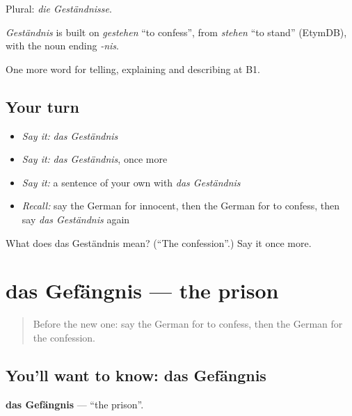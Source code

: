 Plural: \emph{die Geständnisse}.

\begin{cousinweb}
\emph{Geständnis} is built on \emph{gestehen} \textquotedblleft{}to confess\textquotedblright{}, from \emph{stehen} \textquotedblleft{}to stand\textquotedblright{} (EtymDB), with the noun ending \emph{-nis}.
\end{cousinweb}

\begin{grammarlens}[title={What you've built}]
One more word for telling, explaining and describing at B1.
\end{grammarlens}

\subsection*{Your turn}
\begin{itemize}
\raggedright
  \item \emph{Say it:} \emph{das Geständnis}
  \item \emph{Say it:} \emph{das Geständnis}, once more
  \item \emph{Say it:} a sentence of your own with \emph{das Geständnis}
  \item \emph{Recall:} say the German for innocent, then the German for to confess, then say \emph{das Geständnis} again
\end{itemize}

\begin{tcolorbox}[breakable,colback=teal!4,colframe=teal!35!black,title={Before you move on}]
What does das Geständnis mean? (\textquotedblleft{}The confession\textquotedblright{}.) Say it once more.
\end{tcolorbox}
\section[das Gefängnis]{das Gefängnis — the prison}

\label{lesson:GE-C287-gefaengnis}



\begin{quote}
Before the new one: say the German for to confess, then the German for the confession.
\end{quote}

\subsection*{You'll want to know: das Gefängnis}
\textbf{das Gefängnis} — \textquotedblleft{}the prison\textquotedblright{}.

